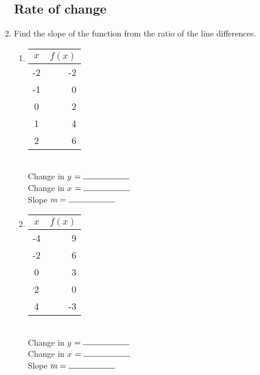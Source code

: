 \documentclass[12pt, twoside]{article}
\begin{document}
\begin{enumerate}
\newpage

\subsection*{Rate of change}

\item Find the slope of the function from the ratio of the line differences.

  \begin{multicols}{2}
  \begin{enumerate}
    \item
      \begin{tabular}{|c|r|}
      \hline
      $x$ & $f(x)$\\
      \hline
      -2 & -2 \\
      \hline
      -1 & 0 \\
      \hline
      0 & 2 \\
      \hline
      1 & 4 \\
      \hline
      2 & 6 \\
      \hline
      \end{tabular}\\[0.85cm]

      Change in $y$ $= \rule{2cm}{0.15mm}$ \\[0.5cm]
      Change in $x$ $= \rule{2cm}{0.15mm}$ \\[0.5cm]
      Slope $m= \rule{2cm}{0.15mm}$\\

    \item
      \begin{tabular}{|c|r|}
      \hline
      $x$ & $f(x)$\\
      \hline
      -4 & 9 \\
      \hline
      -2 & 6 \\
      \hline
      0 & 3 \\
      \hline
      2 & 0 \\
      \hline
      4 & -3 \\
      \hline
      \end{tabular}\\[0.85cm]

      Change in $y$ $= \rule{2cm}{0.15mm}$ \\[0.5cm]
      Change in $x$ $= \rule{2cm}{0.15mm}$ \\[0.5cm]
      Slope $m= \rule{2cm}{0.15mm}$\\


    \end{enumerate}
    \end{multicols}


\end{enumerate}
\end{document}
